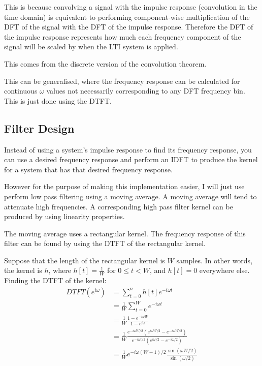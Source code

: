 This is because convolving a signal with the impulse response (convolution in the time domain)
is equivalent to performing component-wise multiplication of the DFT of the signal with the DFT of the impulse response.
Therefore the DFT of the impulse response represents how much each frequency component of the signal will be scaled by
when the LTI system is applied.

This comes from the discrete version of the convolution theorem.

This can be generalised, where the frequency response can be calculated for continuous $\omega$ values 
not necessarily corresponding to any DFT frequency bin. This is just done using the DTFT.

\subsection{Filter Design}
Instead of using a system's impulse response to find its frequency response, 
you can use a desired frequency response and perform an IDFT to produce the 
kernel for a system that has that desired frequency response.

However for the purpose of making this implementation easier, I will just use 
perform low pass filtering using a moving average. A moving average will 
tend to attenuate high frequencies. A corresponding high pass filter kernel can be
produced by using linearity properties.

The moving average uses a rectangular kernel.
The frequency response of this filter can be found by using the DTFT of the rectangular kernel.
\pagebreak 

Suppose that the length of the rectangular kernel is $W$ samples. 
In other words, the kernel is $h$, where $h[t]=\frac{1}{W}$ for $0\leq t < W$, and $h[t]=0$ everywhere else.
Finding the DTFT of the kernel:
\begin{align*}
    DTFT(e^{i\omega})
    &= \sum_{t=0}^n h[t] e^{-i\omega t}\\
    &= \frac{1}{W} \sum_{t=0}^W e^{-i\omega t}\\
    &= \frac{1}{W} \frac{1-e^{-i\omega W }}{1-e^{i\omega }}\\
    &= \frac{1}{W} \frac{e^{-i\omega W /2}(e^{i\omega W /2}-e^{-i\omega W /2})}{e^{-i\omega t/2}(e^{i\omega /2}-e^{-i\omega /2})}\\
    &= \frac{1}{W} e^{-i\omega (W-1) /2} \frac{\sin (\omega W /2)}{\sin (\omega /2)}
\end{align*}


